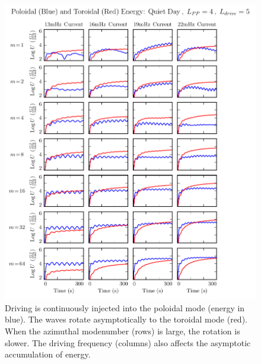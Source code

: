 \begin{figure}[!htb]
    \centering
    \includegraphics[width=\textwidth]{figures/U_2_4_5.pdf}
    \caption[Poloidal and Toroidal Energy: Quiet Day, Typical Plasmasphere]{
      Driving is continuously injected into the poloidal mode (energy in blue). The waves rotate asymptotically to the toroidal mode (red). When the azimuthal modenumber (rows) is large, the rotation is slower. The driving frequency (columns) also affects the asymptotic accumulation of energy. 
    }
    \label{fig_U_2_4_5}
\end{figure}


